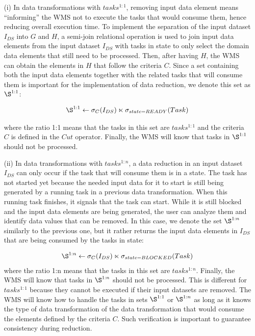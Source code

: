 (i) In data transformations with $tasks^{1:1}$, removing input data
element means ``informing'' the WMS not to execute the tasks that would
consume them, hence reducing overall execution time.
To implement the separation of the input dataset $I_{DS}$ into $G$ and $H$, a semi-join relational operation \cite{Ozsu2011Principles}
is used to join input data elements from the input dataset $I_{DS}$
with tasks in  state to only select the domain data
elements that still need to be processed. Then, after having $H$,
the WMS can obtain the elements in $H$ that follow the criteria
$C$.
Since a set containing both the input data elements together with
the related tasks that will consume them is important for the
implementation of data reduction, we denote this set as $\S^{1:1}$:

$$\S^{1:1} \leftarrow \sigma_C(I_{DS}) \ltimes \sigma_{state = READY}(Task)$$

\noindent where the ratio 1:1 means that the tasks in this set are
$tasks^{1:1}$ and the
criteria $C$ is defined in the $Cut$ operator. Finally, the
WMS will know that tasks in $\S^{1:1}$ should not be processed.

(ii) In data transformations with $tasks^{1:n}$, a data reduction in an
input dataset $I_{DS}$ can only occur if the task that will consume
them is in a  state.
The task has not started yet because the
needed input data for it to start is still being generated by a running
task in a previous data transformation. When this running task finishes, it signals
that the  task can start. While it is still blocked and the input
data elements are being generated, the user can analyze them and
identify data values that can be removed. In this case, we denote the
set $\S^{1:n}$ similarly to the previous one, but it rather returns the
input data elements in $I_{DS}$ that are being consumed by the tasks in
 state:



$$
\S^{1:n} \leftarrow  \sigma_C(I_{DS}) \ltimes \sigma_{state=BLOCKED}(Task)
$$
where the ratio 1:n means that the tasks in this set are
$tasks^{1:n}$. Finally, the WMS will know that tasks in $\S^{1:n}$
should not be processed. This is different for
$tasks^{1:1}$ because they cannot be executed if their input
datasets are removed. The WMS will know how to handle the tasks in
sets $\S^{1:1}$ or $\S^{1:n}$ as long as it knows the type of data
transformation of the data transformation that would consume the elements defined
by the criteria $C$. Such verification is important to guarantee
consistency during reduction.



